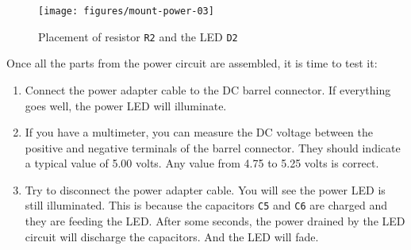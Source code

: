 \begin{figure}[h]
  \centering
  \texttt{[image: figures/mount-power-03]}
  \caption{Placement of resistor {\tt R2} and the LED {\tt D2}}
  \label{fig:mount-power-03}
\end{figure}

Once all the parts from the power circuit are assembled, it is time to test it:

\begin{enumerate}
  \item Connect the power adapter cable to the DC barrel connector. If everything goes well, the power LED will illuminate.
  \item If you have a multimeter, you can measure the DC voltage between the positive and negative terminals of the barrel connector. They should indicate a typical value of 5.00 volts. Any value from 4.75 to 5.25 volts is correct.
  \item Try to disconnect the power adapter cable. You will see the power LED is still illuminated. This is because the capacitors {\tt C5} and {\tt C6} are charged and they are feeding the LED. After some seconds, the power drained by the LED circuit will discharge the capacitors. And the LED will fade.
\end{enumerate}
